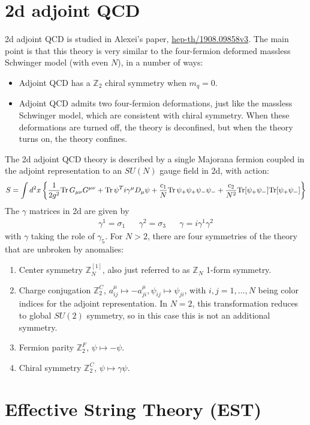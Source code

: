 \section{2d adjoint QCD}

2d adjoint QCD is studied in Alexei's paper, \href{https://arxiv.org/pdf/1908.09858.pdf}{hep-th/1908.09858v3}. The main point is that this theory is very similar to the four-fermion deformed massless Schwinger model (with even $N$), in a number of ways:
\begin{itemize}
	\item Adjoint QCD has a $\mathbb Z_2$ chiral symmetry when $m_q = 0$.
	\item Adjoint QCD admits two four-fermion deformations, just like the massless Schwinger model, which are consistent with chiral symmetry. When these deformations are turned off, the theory is deconfined, but when the theory turns on, the theory confines. 
\end{itemize}

The 2d adjoint QCD theory is described by a single Majorana fermion coupled in the adjoint representation to an $SU(N)$ gauge field in 2d, with action:
\begin{equation}
	S = \int d^2x \left\{ \frac{1}{2g^2} \mathrm{Tr}\, G_{\mu\nu} G^{\mu\nu} + \mathrm{Tr}\, \psi^T i\gamma^\mu D_\mu \psi + \frac{c_1}{N} \mathrm{Tr}\, \psi_+ \psi_+ \psi_- \psi_- + \frac{c_2}{N^2} \mathrm{Tr}[\psi_+ \psi_-] \mathrm{Tr}[\psi_+ \psi_-]\right\}
\end{equation}
The $\gamma$ matrices in 2d are given by
\begin{align}
	\gamma^1 = \sigma_1 && \gamma^2 = \sigma_3 && \gamma = i\gamma^1\gamma^2
\end{align}
with $\gamma$ taking the role of $\gamma_5$. For $N > 2$, there are four symmetries of the theory that are unbroken by anomalies:
\begin{enumerate}
	\item Center symmetry $\mathbb Z_N^{[1]}$, also just referred to as $\mathbb Z_N$ 1-form symmetry. 
	\item Charge conjugation $\mathbb Z_2^C$, $a_{ij}^\mu\mapsto -a_{ji}^\mu, \psi_{ij}\mapsto \psi_{ji}$, with $i, j = 1, ..., N$ being color indices for the adjoint representation. In $N = 2$, this transformation reduces to global $SU(2)$ symmetry, so in this case this is not an additional symmetry. 
	\item Fermion parity $\mathbb Z_2^F$, $\psi\mapsto -\psi$. 
	\item Chiral symmetry $\mathbb Z_2^C$, $\psi\mapsto \gamma \psi$. 
\end{enumerate}



\newpage
\section{Effective String Theory (EST)}

